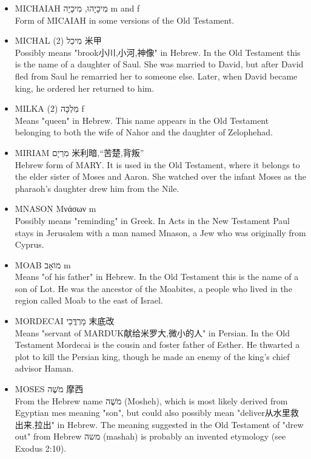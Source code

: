 \begin{itemize}
From the Hebrew name מִיכָאֵל (Mikha'el) meaning "who is like God?". This is a rhetorical question, implying no person is like God. Michael is one of the archangels in Hebrew tradition and the only one identified as an archangel in the Bible. In the Book of Daniel in the Old Testament he is named as a protector of Israel. In the Book of Revelation in the New Testament he is portrayed as the leader of heaven's armies in the war against Satan.
\item MICHAIAH מִיכָיָהוּ, מִיכָיָה m and f \\
Form of MICAIAH in some versions of the Old Testament.
\item MICHAL (2) מִיכַל 米甲 \\
Possibly means "brook小川,小河,神像" in Hebrew. In the Old Testament this is the name of a daughter of Saul. She was married to David, but after David fled from Saul he remarried her to someone else. Later, when David became king, he ordered her returned to him.
\item MILKA (2) מִלְכָּה f \\
Means "queen" in Hebrew. This name appears in the Old Testament belonging to both the wife of Nahor and the daughter of Zelophehad.
\item MIRIAM מִרְיָם 米利暗,“苦楚,背叛” \\
Hebrew form of MARY. It is used in the Old Testament, where it belongs to the elder sister of Moses and Aaron. She watched over the infant Moses as the pharaoh's daughter drew him from the Nile. 
\item MNASON Μνάσων m \\
Possibly means "reminding" in Greek. In Acts in the New Testament Paul stays in Jerusalem with a man named Mnason, a Jew who was originally from Cyprus.
\item MOAB מוֹאָב m \\
Means "of his father" in Hebrew. In the Old Testament this is the name of a son of Lot. He was the ancestor of the Moabites, a people who lived in the region called Moab to the east of Israel.
\item MORDECAI מָרְדֳּכַי 末底改 \\
Means "servant of MARDUK献给米罗大,微小的人" in Persian. In the Old Testament Mordecai is the cousin and foster father of Esther. He thwarted a plot to kill the Persian king, though he made an enemy of the king's chief advisor Haman.
\item MOSES מֹשֶׁה 摩西 \\
From the Hebrew name מֹשֶׁה (Mosheh), which is most likely derived from Egyptian mes meaning "son", but could also possibly mean "deliver从水里救出来,拉出" in Hebrew. The meaning suggested in the Old Testament of "drew out" from Hebrew משה (mashah) is probably an invented etymology (see Exodus 2:10).
\end{itemize}

